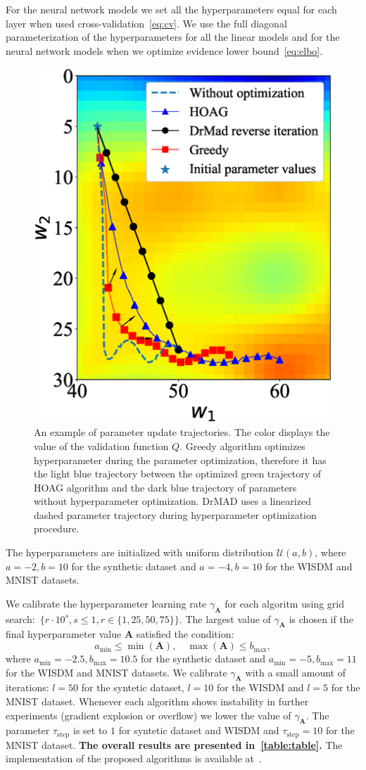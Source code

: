\documentclass[smallcondensed]{svjour3}
\begin{document}
For the neural network models we set all the hyperparameters equal for each layer when used  cross-validation~\eqref{eq:cv}. We use the full diagonal parameterization of the hyperparameters for all the linear models and for the neural network models when we optimize evidence lower bound~\eqref{eq:elbo}.


\begin{figure}[tbh!]
    \centering
    \includegraphics[width=0.5\linewidth]{plots/Fig_traj2.eps}

    \caption{An example of parameter update trajectories. The color displays the value of the validation function $Q$. Greedy algorithm optimizes hyperparameter during the parameter optimization, therefore it has the light blue trajectory between the optimized green trajectory of HOAG algorithm and the dark blue trajectory of parameters without hyperparameter optimization. DrMAD uses a linearized dashed parameter trajectory during hyperparameter optimization procedure.  }
    \end{figure}


The hyperparameters are initialized with uniform distribution $\mathcal{U}(a,b)$,
where $a = -2, b = 10$ for the synthetic dataset and $a = -4, b = 10$  for the WISDM and MNIST datasets.

We calibrate the hyperparameter learning rate $\gamma_{\mathbf{A}}$  for each algoritm using grid search:~$\{r \cdot 10^{s}, s \leq 1, r \in \{1,25,50,75\}\}$. The largest value of $\gamma_{\mathbf{A}}$ is chosen if the final hyperparameter value $\mathbf{A}$ satisfied the condition:
\[
    a_\text{min} \leq  \min(\mathbf{A}), \quad \max(\mathbf{A}) \leq b_\text{max},
\] 
where $a_\text{min} = -2.5, b_\text{max}=10.5$ for the synthetic dataset and $a_\text{min} = -5, b_\text{max}=11$ for the WISDM and MNIST datasets. We calibrate $\gamma_\mathbf{A}$ with a small amount of iterations: $l=50$ for the syntetic dataset, $l=10$ for the WISDM and $l=5$ for the MNIST dataset. Whenever each algorithm shows instability in further experiments (gradient explosion or overflow) we lower the value of $\gamma_{\mathbf{A}}$. The parameter $\tau_\text{step}$ is set to $1$ for syntetic dataset and WISDM and  $\tau_\text{step}=10$ for the MNIST dataset.
\textbf{The overall results are presented in~\ref{table:table}.} The implementation of the proposed algorithms is available at~\cite{pyfos}.
\end{document}
